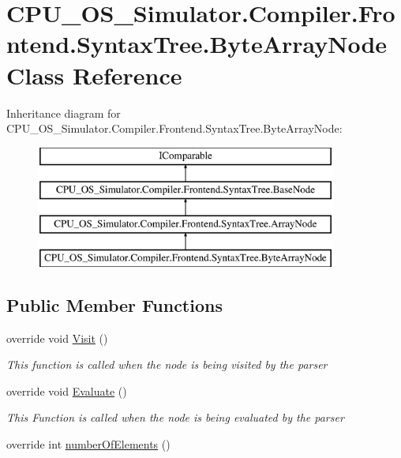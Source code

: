 \hypertarget{class_c_p_u___o_s___simulator_1_1_compiler_1_1_frontend_1_1_syntax_tree_1_1_byte_array_node}{}\section{C\+P\+U\+\_\+\+O\+S\+\_\+\+Simulator.\+Compiler.\+Frontend.\+Syntax\+Tree.\+Byte\+Array\+Node Class Reference}
\label{class_c_p_u___o_s___simulator_1_1_compiler_1_1_frontend_1_1_syntax_tree_1_1_byte_array_node}
Inheritance diagram for C\+P\+U\+\_\+\+O\+S\+\_\+\+Simulator.\+Compiler.\+Frontend.\+Syntax\+Tree.\+Byte\+Array\+Node\+:\begin{figure}[H]
\begin{center}
\leavevmode
\includegraphics[height=4.000000cm]{class_c_p_u___o_s___simulator_1_1_compiler_1_1_frontend_1_1_syntax_tree_1_1_byte_array_node}
\end{center}
\end{figure}
\subsection*{Public Member Functions}
\begin{DoxyCompactItemize}
\item 
override void \hyperlink{class_c_p_u___o_s___simulator_1_1_compiler_1_1_frontend_1_1_syntax_tree_1_1_byte_array_node_a1ed9d8d35aeb8537758718aa1bae1ae0}{Visit} ()
\begin{DoxyCompactList}\small\item\em This function is called when the node is being visited by the parser \end{DoxyCompactList}\item 
override void \hyperlink{class_c_p_u___o_s___simulator_1_1_compiler_1_1_frontend_1_1_syntax_tree_1_1_byte_array_node_ad34fd3396bf5e6e179d941d2076f28d9}{Evaluate} ()
\begin{DoxyCompactList}\small\item\em This Function is called when the node is being evaluated by the parser \end{DoxyCompactList}\item 
override int \hyperlink{class_c_p_u___o_s___simulator_1_1_compiler_1_1_frontend_1_1_syntax_tree_1_1_byte_array_node_a899a0a2406a3e09828de51918a13afba}{number\+Of\+Elements} ()
\end{DoxyCompactItemize}

